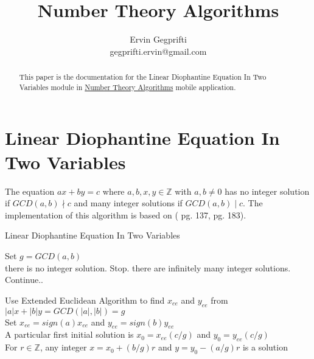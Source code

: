 \documentclass[12pt,oneside,a4paper]{article}
\title{Number Theory Algorithms}
\author{Ervin Gegprifti \\ [6pt]
	gegprifti.ervin@gmail.com}
\date{}
\begin{document}
\pagecolor{bgcolor}

\maketitle

\begin{abstract}
	This paper is the documentation for the Linear Diophantine Equation In Two Variables module in \href{https://play.google.com/store/apps/details?id=com.gegprifti.android.numbertheoryalgorithms}{Number Theory Algorithms} mobile application.
\end{abstract}

\section*{Linear Diophantine Equation In Two Variables}	
The equation $ax+by=c$ where $a,b,x,y \in \mathbb{Z}$ with $a,b \neq 0$ has no integer solution if $GCD(a,b) \nmid c$ and many integer solutions if $GCD(a,b) \mid c$. The implementation of this algorithm is based on (\cite{rosen2011elementary} pg. 137, \cite{tattersall1999elementary} pg. 183). \\


\begin{algorithm}[H]
	\caption{Linear Diophantine Equation In Two Variables}
	\DontPrintSemicolon
	\SetAlgoLined
	
	\BlankLine
	
	Set $g=GCD(a,b)$ \\
	 { there is no integer solution. Stop. }
	 { there are infinitely many integer solutions. Continue.. }
	
	Use Extended Euclidean Algorithm to find $x_{ee}$ and $y_{ee}$ from $|a|x+|b|y=GCD(|a|,|b|)=g$ \\
	Set $x_{ee} = sign(a)x_{ee}$ and $y_{ee} = sign(b)y_{ee}$ \\
	A particular first initial solution is $x_0 = x_{ee}(c/g)$ and $y_0 = y_{ee}(c/g)$ \\
	For $r \in \mathbb{Z}$, any integer $x=x_0 + (b/g)r$ and $y=y_0 - (a/g)r$ is a solution \\
	
\end{algorithm}
\end{document}
